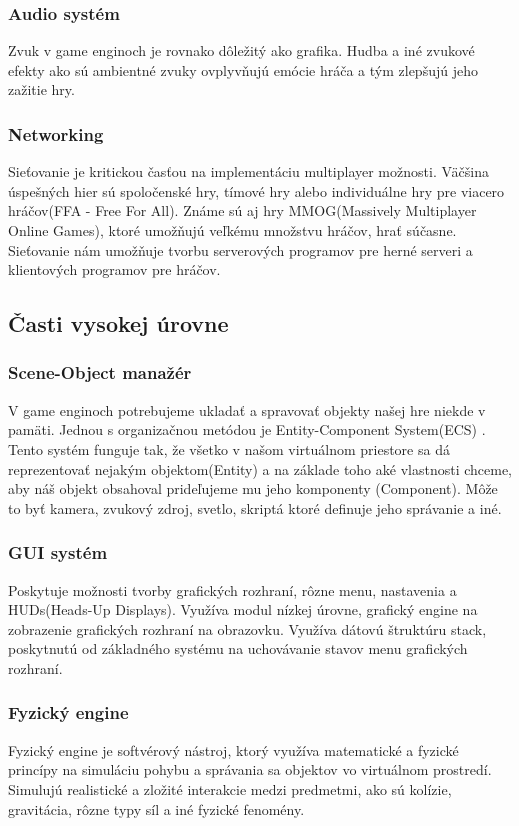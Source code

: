 \documentclass[10pt,oneside,slovak,a4paper,hidelinks]{article}
\begin{document}
		\subsubsection{Audio systém}
			Zvuk v game enginoch je rovnako dôležitý ako grafika. Hudba a iné zvukové efekty ako sú ambientné zvuky ovplyvňujú emócie hráča a tým zlepšujú jeho zažitie hry.
		\subsubsection{Networking}
			Sieťovanie je kritickou časťou na implementáciu multiplayer možnosti. Väčšina úspešných hier sú spoločenské hry, tímové hry alebo individuálne hry pre viacero hráčov(FFA - Free For All). Známe sú aj hry MMOG(Massively Multiplayer Online Games), ktoré umožňujú veľkému množstvu hráčov, hrať súčasne. Sieťovanie nám umožňuje tvorbu serverových programov pre herné serveri a klientových programov pre hráčov.
	\subsection{Časti vysokej úrovne}
		\subsubsection{Scene-Object manažér}
			V game enginoch potrebujeme ukladať a spravovať objekty našej hre niekde v pamäti. Jednou s organizačnou metódou je Entity-Component System(ECS) \cite{ECS}. Tento systém funguje tak, že všetko v našom virtuálnom priestore sa dá reprezentovať nejakým objektom(Entity) a na základe toho aké vlastnosti chceme, aby náš objekt obsahoval prideľujeme mu jeho komponenty (Component). Môže to byť kamera, zvukový zdroj, svetlo, skriptá ktoré definuje jeho správanie a iné.
		\subsubsection{GUI systém}
			Poskytuje možnosti tvorby grafických rozhraní, rôzne menu, nastavenia a HUDs(Heads-Up Displays). Využíva modul nízkej úrovne, grafický engine na zobrazenie grafických rozhraní na obrazovku. Využíva dátovú štruktúru stack, poskytnutú od základného systému na uchovávanie stavov menu grafických rozhraní.
		\subsubsection{Fyzický engine}
			Fyzický engine je softvérový nástroj, ktorý využíva matematické a fyzické princípy na simuláciu pohybu a správania sa objektov vo virtuálnom prostredí. Simulujú realistické a zložité interakcie medzi predmetmi, ako sú kolízie, gravitácia, rôzne typy síl a iné fyzické fenomény.
\end{document}
